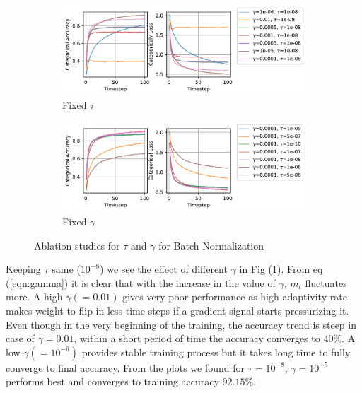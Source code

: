 \begin{figure}[!ht]
\centering
    \begin{subfigure}{0.98\textwidth}
        \includegraphics[width=1.\linewidth]{fig/AccuracyLossBNfixedtau.pdf}
        \caption{Fixed $\tau$}
        \label{fig:bnfixedtau}
    \end{subfigure}
    \begin{subfigure}{0.98\textwidth}
        \includegraphics[width=1.\linewidth]{fig/AccuracyLossBNfixedgamma.pdf}
        \caption{Fixed $\gamma$}
        \label{fig:bnfixedgamma}
    \end{subfigure}
    \caption{Ablation studies for $\tau$ and $\gamma$ for Batch Normalization}
\end{figure}

Keeping $\tau$ same ($10^{-8}$) we see the effect of different $\gamma$ in Fig (\ref{fig:bnfixedtau}). From eq (\ref{eqn:gamma}) it is clear that with the increase in the value of $\gamma$, $m_t$ fluctuates more. A high $\gamma (=0.01)$ gives very poor performance as high adaptivity rate makes weight to flip in less time steps if a gradient signal starts pressurizing it. Even though in the very beginning of the training, the accuracy trend is steep in case of $\gamma=0.01$, within a short period of time the accuracy converges to $40\%$. A low $\gamma (=10^{-6})$ provides stable training process but it takes long time to fully converge to final accuracy. From the plots we found for $\tau=10^{-8}$, $\gamma=10^{-5}$ performs best and converges to training accuracy $92.15\%$.

